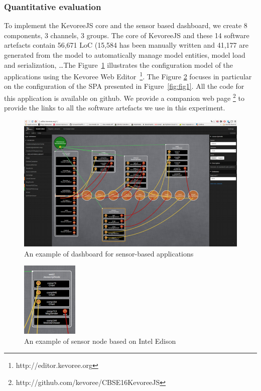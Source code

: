 \subsubsection{Quantitative evaluation}
To implement the KevoreeJS core and the sensor based dashboard, we create 8 components, 3 channels, 3 groups. The core of KevoreeJS and these 14 software artefacts contain 56,671 LoC (15,584 has been manually written and 41,177 are generated from the model to automatically manage model entities, model load and serialization, \dots The Figure~\ref{fig:fig3}  illustrates the configuration model of the applications using the Kevoree Web Editor~\footnote{http://editor.kevoree.org}. The Figure \ref{fig:fig4} focuses in particular on the configuration of the SPA presented in Figure~\ref{fig:fig1}. All the code for this application is available on github. We provide a companion web page \footnote{http://github.com/kevoree/CBSE16KevoreeJS} to provide the links to all the software artefacts we use in this experiment.  


\begin{figure}[h]
	\centering
	\includegraphics[width=1\linewidth]{figures/fig1}
	\caption{An example of dashboard for sensor-based applications}
	\label{fig:fig3}
\end{figure}


\begin{figure}[h]
	\centering
	\includegraphics[width=0.5\linewidth]{figures/fig2}
	\caption{An example of sensor node based on Intel Edison}
	\label{fig:fig4}
\end{figure}



